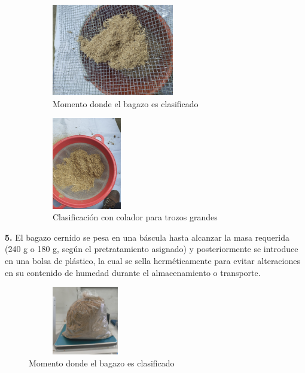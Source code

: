 \documentclass[12pt]{article}
\begin{document}
		
	
		\begin{figure}[H]
			\centering
			\begin{subfigure}[t]{0.48\textwidth} %
				\centering
				\includegraphics[width=\linewidth, height=4cm, keepaspectratio]{imagenes/cernir_bagazo_2}
				\caption{Momento donde el bagazo es clasificado}
				\label{cernir_bagazo_2C}
			\end{subfigure}
			\hfill
			\begin{subfigure}[t]{0.48\textwidth}
				\centering
				\includegraphics[width=\linewidth, height=4cm, keepaspectratio]{imagenes/cernir_bagazo_cedazo}
				\caption{Clasificación con colador para trozos grandes}
				\label{cernir_bagazo_cedazo}
			\end{subfigure}
			\caption{}
			\label{fig:Cd}
		\end{figure}
	
			\textbf{5.} El bagazo cernido se pesa en una báscula hasta alcanzar la masa requerida (240 g o 180 g, según el pretratamiento asignado) y posteriormente se introduce en una bolsa de plástico, la cual se sella herméticamente para evitar alteraciones en su contenido de humedad durante el almacenamiento o transporte.
			
			
			\begin{figure} [H]
				\centering
				\includegraphics[width=5cm, height=3cm]{imagenes/cernir_bagazo_pesado}
				\caption{Momento donde el bagazo es clasificado}
				\label{cernir_bagazo_pesado}
			\end{figure}
			
\end{document}
